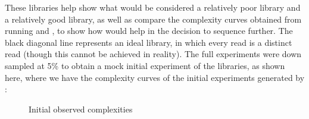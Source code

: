\documentclass[11pt, titlepage]{article}
\begin{document}
These libraries help show what would be considered a relatively poor library and a relatively good library, as well as compare the complexity curves obtained from running  and , to show how  would help in the decision to sequence further. The black diagonal line represents an ideal library, in which every read is a distinct read (though this cannot be achieved in reality). The full experiments were down sampled at 5\% to obtain a mock initial experiment of the libraries, as shown here, where we have the complexity curves  of the initial experiments generated by :
~\newline
\newline
\begin{figure}[h!]
\centering
{}
\caption{Initial observed complexities}
\end{figure}
\end{document}
